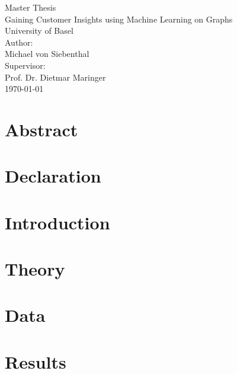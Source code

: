 \documentclass[12pt]{report}
\begin{document}
  
  \begin{titlepage}
    \begin{center}
      \vspace{1em}
	  \large{Master Thesis}\\
	  \huge Gaining Customer Insights using Machine Learning on Graphs \\ 
	  \large \vspace{1em}
	  University of Basel\\
	  \vspace{4em} 
	  \large
	  Author: \\
	  Michael von Siebenthal\\
	  \vspace{2em}
	  Supervisor: \\
	  Prof. Dr. Dietmar Maringer\\
	  \vspace{2em}
	  \today
	  \vspace{3em}
    \end{center}
  \end{titlepage} 



  \chapter*{Abstract}
  
  
  \chapter*{Declaration}
  


  \setcounter{secnumdepth}{3}
  \setcounter{tocdepth}{3}
  \tableofcontents
  \listoffigures
  \listoftables

  \onehalfspacing
  
  \chapter{Introduction}
  


  \chapter{Theory}
  
  \label{section:theory}
 

  \chapter{Data}
  
  \label{section:data}

  \chapter{Results}
  
  \label{section:results}

   

  \appendix
  
\end{document}
